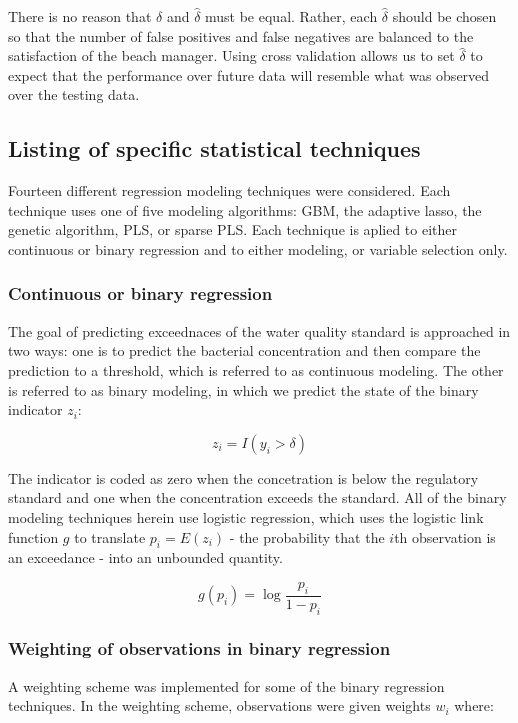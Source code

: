 \documentclass[english]{article}\usepackage[]{graphicx}\usepackage[]{color}
\numberwithin{equation}{section}
\numberwithin{figure}{section}
\renewcommand\[{\begin{equation}}
\renewcommand\]{\end{equation}}
\begin{document}
There is no reason that $\delta$ and $\hat{{\delta}}$ must be equal.
Rather, each $\hat{{\delta}}$ should be chosen so that the number
of false positives and false negatives are balanced to the satisfaction
of the beach manager. Using cross validation allows us to set $\hat{{\delta}}$
to expect that the performance over future data will resemble what
was observed over the testing data.


\subsection{Listing of specific statistical techniques}

Fourteen different regression modeling techniques were considered.
Each technique uses one of five modeling algorithms: GBM, the adaptive
lasso, the genetic algorithm, PLS, or sparse PLS. Each technique is
aplied to either continuous or binary regression and to either modeling,
or variable selection only.


\subsubsection*{Continuous or binary regression}

The goal of predicting exceednaces of the water quality standard is
approached in two ways: one is to predict the bacterial concentration
and then compare the prediction to a threshold, which is referred
to as continuous modeling. The other is referred to as binary modeling,
in which we predict the state of the binary indicator $z_{i}$:

\[
z_{i}=I(y_{i}>\delta)
\]


The indicator is coded as zero when the concetration is below the
regulatory standard and one when the concentration exceeds the standard.
All of the binary modeling techniques herein use logistic regression,
which uses the logistic link function $g$ to translate $p_{i}=E(z_{i})$
- the probability that the $i$th observation is an exceedance - into
an unbounded quantity.

\[
g(p_{i})=\log\frac{p_{i}}{1-p_{i}}
\]



\subsubsection*{Weighting of observations in binary regression}

A weighting scheme was implemented for some of the binary regression
techniques. In the weighting scheme, observations were given weights
$w_{i}$ where:
\end{document}

